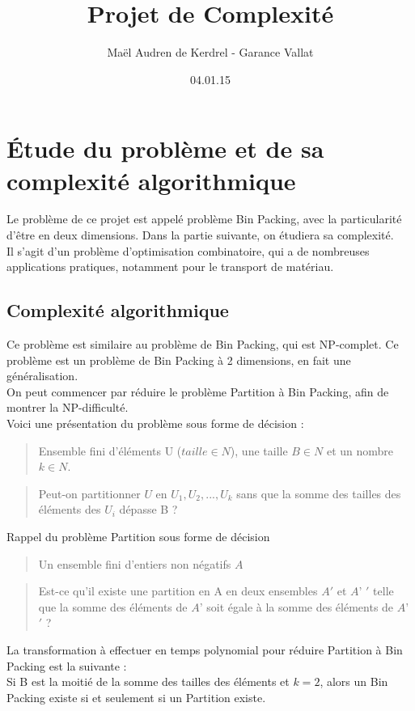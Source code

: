 \documentclass[12pt]{article}
\title{Projet de Complexité}
\author{Maël Audren de Kerdrel - Garance Vallat}
\date{04.01.15}
\begin{document}
\maketitle
\newpage


\section{Étude du problème et de sa complexité algorithmique}
Le problème de ce projet est appelé problème Bin Packing, avec la particularité d'être en deux dimensions. Dans la partie suivante, on étudiera sa complexité. \\
Il s'agit d'un problème d'optimisation combinatoire, qui a de nombreuses applications pratiques, notamment pour le transport de matériau.


\subsection*{Complexité algorithmique}
Ce problème est similaire au problème de Bin Packing, qui est NP-complet. 
Ce problème est un problème de Bin Packing à 2 dimensions, en fait une généralisation. \\
On peut commencer par réduire le problème Partition à Bin Packing, afin de montrer la NP-difficulté. \\

Voici une présentation du problème sous forme de décision : \\
   \begin{quote}
Ensemble fini d'éléments U ($taille \in N$), une taille $B\in N$ et un nombre $k\in N$.  \end{quote}
   \begin{quote}
Peut-on partitionner $U$ en $U_1, U_2, ..., U_k$ sans que la somme des tailles des éléments des $U_i$ dépasse B ?  \end{quote}

Rappel du problème Partition sous forme de décision\\
  \begin{quote}
 Un ensemble fini d’entiers non négatifs $A$  \end{quote}
 \begin{quote}
 Est-ce qu’il existe une partition en A en deux ensembles $A'$ et $A’$ $'$ telle que la somme des éléments de $A’$ soit égale à la somme des éléments de $A’$ $'$ ?
 \end{quote}
La transformation à effectuer en temps polynomial pour réduire Partition à Bin Packing est la suivante : \\
Si B est la moitié de la somme des tailles des éléments et $ k = 2$, alors un Bin Packing existe si et seulement si un Partition existe. \\
\end{document}
